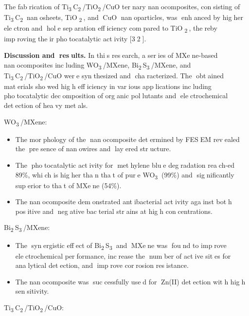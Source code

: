 {The fabrication of
Ti\textsubscript{3}C\textsubscript{2}/TiO\textsubscript{2}/CuO
ternary nanocomposites, consisting of
Ti\textsubscript{3}C\textsubscript{2} nanosheets,
TiO\textsubscript{2}, and CuO nanoparticles, was enhanced by
higher electron and hole separation efficiency compared to
TiO\textsubscript{2}, thereby improving their photocatalytic
activity {[}32{]}.

{\bfseries Discussion and results.} In this research, a series of
MXene-based nanocomposites including WO\textsubscript{3}/MXene,
Bi\textsubscript{2}S\textsubscript{3}/MXene, and
Ti\textsubscript{3}C\textsubscript{2}/TiO\textsubscript{2}/CuO were
synthesized and characterized. The obtained materials showed
high efficiency in various applications including photocatalytic
decomposition of organic pollutants and electrochemical detection
of heavy metals.

WO\textsubscript{3}/MXene:

\begin{itemize}
\item
  The morphology of the nanocomposite determined by FESEM revealed
  the presence of nanowires and layered structure.
\item
  The photocatalytic activity for methylene blue degradation
  reach-ed 89\%, which is higher than that of pure
  WO\textsubscript{3} (99\%) and significantly superior to that of
  MXene (54\%).
\item
  The nanocomposite demonstrated antibacterial activity against
  both positive and negative bacterial strains at high
  concentrations.
\end{itemize}

Bi\textsubscript{2}S\textsubscript{3}/MXene:

\begin{itemize}
\item
  The synergistic effect of Bi\textsubscript{2}S\textsubscript{3}
  and MXene was found to improve electrochemical performance,
  increase the number of active sites for analytical detection,
  and improve corrosion resistance.
\item
  The nanocomposite was successfully used for Zn(II) detection
  with high sensitivity.
\end{itemize}

Ti\textsubscript{3}C\textsubscript{2}/TiO\textsubscript{2}/CuO:

}
